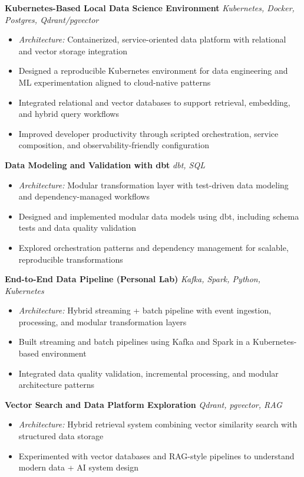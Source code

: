 \textbf{Kubernetes-Based Local Data Science Environment} \hfill {\small\textit{Kubernetes, Docker, Postgres, Qdrant/pgvector}}
\begin{itemize}
	\item \textit{Architecture:} Containerized, service-oriented data platform with relational and vector storage integration
	\item Designed a reproducible Kubernetes environment for data engineering and ML experimentation aligned to cloud-native patterns
	\item Integrated relational and vector databases to support retrieval, embedding, and hybrid query workflows
	\item Improved developer productivity through scripted orchestration, service composition, and observability-friendly configuration
\end{itemize}

\textbf{Data Modeling and Validation with dbt} \hfill {\small\textit{dbt, SQL}}
\begin{itemize}
	\item \textit{Architecture:} Modular transformation layer with test-driven data modeling and dependency-managed workflows
	\item Designed and implemented modular data models using dbt, including schema tests and data quality validation
	\item Explored orchestration patterns and dependency management for scalable, reproducible transformations
\end{itemize}

\textbf{End-to-End Data Pipeline (Personal Lab)} \hfill {\small\textit{Kafka, Spark, Python, Kubernetes}}
\begin{itemize}
	\item \textit{Architecture:} Hybrid streaming + batch pipeline with event ingestion, processing, and modular transformation layers
	\item Built streaming and batch pipelines using Kafka and Spark in a Kubernetes-based environment
	\item Integrated data quality validation, incremental processing, and modular architecture patterns
\end{itemize}

\textbf{Vector Search and Data Platform Exploration} \hfill {\small\textit{Qdrant, pgvector, RAG}}
\begin{itemize}
	\item \textit{Architecture:} Hybrid retrieval system combining vector similarity search with structured data storage
	\item Experimented with vector databases and RAG-style pipelines to understand modern data + AI system design
\end{itemize}
